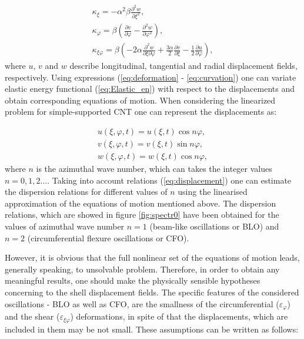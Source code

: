 \begin{eqnarray}\label{eq:curvation}
\kappa_{\xi} = - \alpha^{2} \beta \frac{\partial^{2} w}{\partial \xi^{2}}, \nonumber  \\ 
\kappa_{\varphi} = \beta \left(\frac{\partial v}{\partial \varphi} - \frac{\partial^{2} w}{\partial \varphi^{2}} \right), \\  
\kappa_{\xi \varphi} = \beta \left( - 2 \alpha \frac{\partial^{2} w}{\partial \xi \partial \varphi} + \frac{3 \alpha}{2} \frac{\partial v}{\partial \xi} - \frac{1}{2} \frac{\partial u}{\partial \varphi}\right), \nonumber
\end{eqnarray}
where $u$, $v$ and $w$ describe longitudinal, tangential and radial displacement fields, respectively.
Using expressions (\ref{eq:deformation} - \ref{eq:curvation}) one can variate elastic energy functional (\ref{eq:Elastic_en}) with respect to the displacements and obtain corresponding equations of motion.
When considering the linearized problem for simple-supported CNT one can represent the displacements as:

\begin{eqnarray}\label{eq:displacement}
u(\xi, \varphi, t)=u(\xi, t) \cos{n \varphi},  \nonumber \\
v(\xi, \varphi, t)=v(\xi, t) \sin{n \varphi}, \\
w(\xi, \varphi, t)=w(\xi, t) \cos{n \varphi}, \nonumber
\end{eqnarray} 
where $n$ is the azimuthal wave number, which can takes the integer values $n=0,1,2 \dots$.
Taking into account relations (\ref{eq:displacement}) one can estimate the dispersion relations for different values of $n$ using the linearised approximation of the equations of motion mentioned above.
The dispersion relations, which are showed in figure \ref{fig:spectr0} have been obtained for the values of azimuthal wave number $n=1$ (beam-like oscillations or BLO) and $n=2$ (circumferential flexure oscillations or CFO).

However, it is obvious that the full nonlinear set of the equations of motion leads, generally speaking, to unsolvable problem.
Therefore, in order to obtain any meaningful results, one should make the physically sensible hypotheses concerning to the shell displacement fields.
The specific features of the considered oscillations - BLO as well as CFO, are the smallness of the circumferential  ($\varepsilon_{\varphi}$) and the shear  ($\varepsilon_{\xi \varphi}$) deformations, in spite of that the displacements, which are included in them may be not small.
These assumptions can be written as follows:

